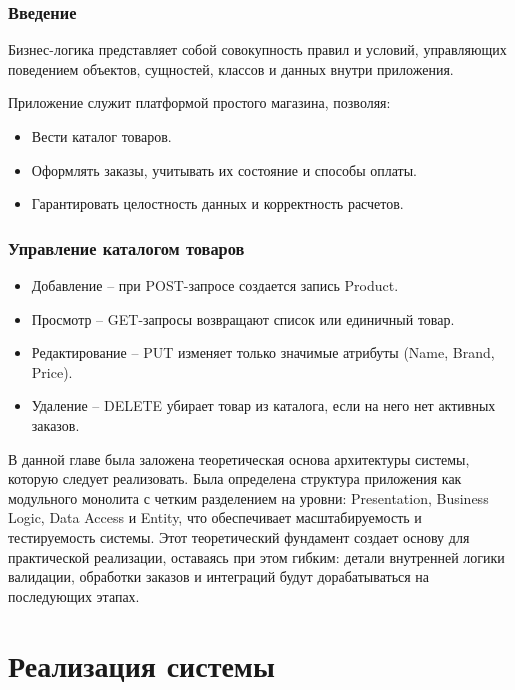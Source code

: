 \documentclass[a4paper,12pt]{report}
\begin{document}
\subsection{Введение}

Бизнес-логика представляет собой совокупность правил и условий, управляющих поведением объектов, сущностей, классов и данных внутри приложения.

Приложение служит платформой простого магазина, позволяя:
\begin{itemize}
    \item
        Вести каталог товаров.
    \item
        Оформлять заказы, учитывать их состояние и способы оплаты.
    \item
        Гарантировать целостность данных и корректность расчетов.
\end{itemize}

\subsection{Управление каталогом  товаров}

\begin{itemize}
    \item
        Добавление -- при POST-запросе создается запись Product.
    \item 
        Просмотр -- GET-запросы возвращают список или единичный товар.
    \item   
        Редактирование -- PUT изменяет только значимые атрибуты (Name, Brand, Price).
    \item
        Удаление -- DELETE убирает товар из каталога, если на него нет активных заказов.
\end{itemize}


В данной главе была заложена теоретическая основа архитектуры системы, которую следует реализовать. 
Была определена структура приложения как модульного монолита с четким разделением на уровни: 
Presentation, Business Logic, Data Access и Entity, что обеспечивает масштабируемость и тестируемость системы.
Этот теоретический фундамент создает основу для практической реализации, оставаясь при этом гибким: 
детали внутренней логики валидации, обработки заказов и интеграций будут дорабатываться на последующих этапах.

\chapter{Реализация системы}\label{implementation_chapter_title}
\end{document}
